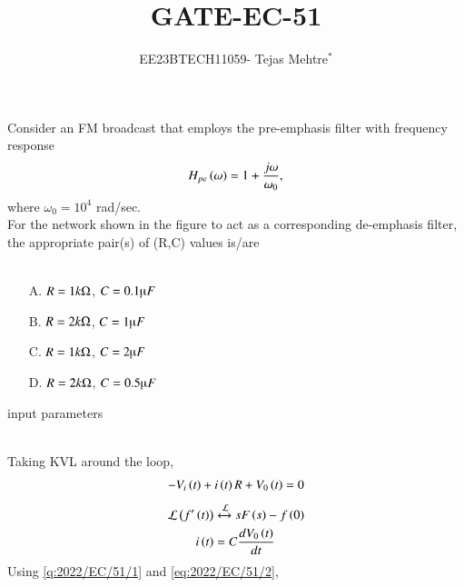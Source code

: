 \documentclass[journal,12pt,onecolumn]{IEEEtran}
\theoremstyle{remark}
\begin{document}
\let\vec\mathbf



\title{GATE-EC-51}
\author{EE23BTECH11059- Tejas Mehtre$^{*}$%
}
\maketitle




\bigskip

\renewcommand{\thefigure}{\theenumi}
\renewcommand{\thetable}{\theenumi}
Consider an FM broadcast that employs the pre-emphasis filter with frequency response \\
    \begin{align*}
        H_{pe}\left(\omega\right)= 1+ \frac{j\omega}{\omega _0},
    \end{align*}
    where $\omega_0=10^4$ rad/sec. \\
    For the network shown in the figure to act as a corresponding de-emphasis filter, the
appropriate pair(s) of (R,C) values is/are 
\underline{\hspace{1in}} \\ \\

\begin{enumerate}
    \item[A.] $R=1k\ohm$, $C=0.1\micro F$
    \item[B.] $R=2k\ohm$, $C=1\micro F$
    \item[C.] $R=1k\ohm$, $C=2\micro F$
    \item[D.] $R=2k\ohm$, $C=0.5\micro F$
\end{enumerate}
  \solution
  \fi
    \begin{table}[!ht]
    \centering
        
    \caption{input parameters}
    \label{}
\end{table}
\\
    Taking KVL around the loop,
    \begin{align}
        -V_i\left(t\right) + i\left(t\right)R + V_0\left(t\right)=0 
    \end{align}
    \begin{align}
        \mathcal{L}\left(f'\left(t\right)\right) &\xleftrightarrow{\mathcal{L}} sF\left(s\right)-f\left(0\right) \label{q:2022/EC/51/1} \\
        i\left(t\right)&= C\frac{dV_0\left(t\right)}{dt} \label{eq:2022/EC/51/2}
    \end{align}
    Using \eqref{q:2022/EC/51/1} and \eqref{eq:2022/EC/51/2},
\end{document}

